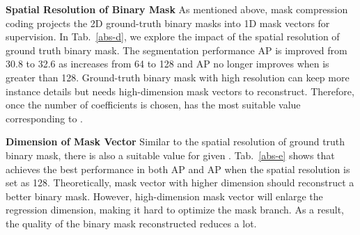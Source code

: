 \documentclass{article}
\begin{document}
\textbf{Spatial Resolution of Binary Mask}
As mentioned above, mask compression coding projects the 2D  ground-truth binary masks into 1D mask vectors for supervision. In Tab.~\ref{abs-d}, we explore the impact of the spatial resolution of ground truth binary mask. The segmentation performance AP is improved from 30.8 to 32.6 as  increases from 64 to 128 and AP no longer improves when  is greater than 128. Ground-truth binary mask with high resolution can keep more instance details but needs high-dimension mask vectors to reconstruct. Therefore, once the number of coefficients  is chosen,  has the most suitable value corresponding to . 

\textbf{Dimension of Mask Vector}
Similar to the spatial resolution of ground truth binary mask, there is also a suitable value  for given . Tab.~\ref{abs-e} shows that  achieves the best performance in both AP and AP when the spatial resolution  is set as 128. Theoretically, mask vector with higher dimension should reconstruct a better binary mask. However, high-dimension mask vector will enlarge the regression dimension, making it hard to optimize the mask branch. As a result, the quality of the binary mask reconstructed reduces a lot.
\end{document}
